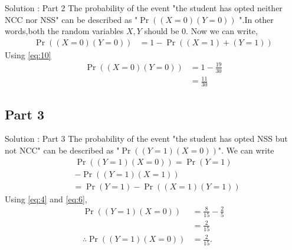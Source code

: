 \documentclass{beamer}
\providecommand{\pr}[1]{\ensuremath{\Pr\left(#1\right)}}
\providecommand{\brak}[1]{\ensuremath{\left(#1\right)}}
\begin{document}
\begin{frame}{Solution : Part 2}
       The probability of the event "the student has opted neither NCC nor NSS" can be described as "$ \pr{\brak{X=0}\brak{Y=0}}$ ".In other words,both the random variables $X,Y$ should be 0.  
                 Now we can write,
                 \begin{align}
                   \pr{\brak{X=0}\brak{Y=0}} &= 1 - \pr{\brak{X = 1} + \brak{Y = 1}}
                 \end{align}
                Using \eqref{eq:10}
                 \begin{align}
	           \pr{\brak{X=0}\brak{Y=0}} &= 1 - \frac{19}{30}\\
                                                            &= \frac{11}{30}                        
                 \end{align}
\end{frame}

\subsection{Part 3}

\begin{frame}{Solution : Part 3}
       The probability of the event "the student has opted NSS but not NCC" can be described as  "$ \pr{\brak{Y=1}\brak{ X = 0}}$". 
                We can write 
                 \begin{equation}
                 \begin{split}
                   \pr{\brak{Y=1}\brak{ X = 0}} = \pr{Y = 1} \\
                                                            - \pr{\brak{Y = 1}\brak{X = 1}}
                 \end{split}
                 \end{equation}
                 \begin{align}
                                                  &= \pr{Y = 1} -  \pr{\brak{X = 1}\brak{Y=1}}
                 \end{align}
               Using \eqref{eq:4} and \eqref{eq:6},
                 \begin{align}
	            \pr{\brak{Y=1}\brak{ X = 0}}  &=  \frac{8}{15} -  \frac{2}{5}\\
                                                                  & = \frac{2}{15}\\
                   \therefore  \pr{\brak{Y=1}\brak{ X = 0}} &= \frac{2}{15}.
                 \end{align}
\end{frame}
    
\end{document}
